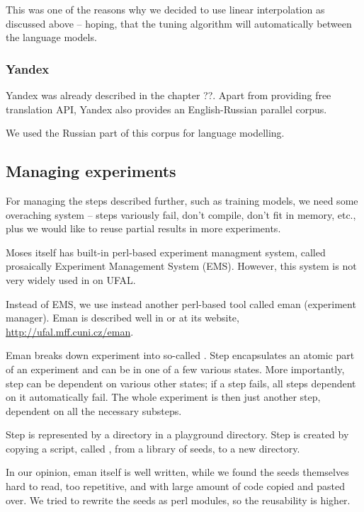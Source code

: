 This was one of the reasons why we decided to use linear interpolation as discussed above -- hoping, that the tuning algorithm will automatically  between the language models.

\subsubsection{Yandex}
Yandex was already described in the chapter ??. Apart from providing free translation API, Yandex also provides an English-Russian parallel corpus.

We used the Russian part of this corpus for language modelling.

\subsection{Managing experiments}
For managing the steps described further, such as training models, we need some overaching system -- steps variously fail, don't compile, don't fit in memory, etc., plus we would like to reuse partial results in more experiments.

Moses itself has built-in perl-based experiment managment system, called prosaically Experiment Management System (EMS). However, this system is not very widely used in on UFAL.

Instead of EMS, we use instead another perl-based tool called eman (experiment manager). Eman is described well in \cite{eman} or at its website, \url{http://ufal.mff.cuni.cz/eman}.  

Eman breaks down experiment into so-called . Step encapsulates an atomic part of an experiment and can be in one of a few various states. More importantly, step can be dependent on various other states; if a step fails, all steps dependent on it automatically fail. The whole experiment is then just another step, dependent on all the necessary substeps.

Step is represented by a directory in a playground directory. Step is created by copying a script, called , from a library of seeds, to a new directory.

In our opinion, eman itself is well written, while we found the seeds themselves hard to read, too repetitive, and with large amount of code copied and pasted over. We tried to rewrite the seeds as perl modules, so the reusability is higher.

